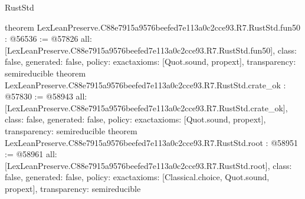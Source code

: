 \begin{lexlean}{RustStd}
\begin{coremodule}
{}
theorem LexLeanPreserve.C88e7915a9576beefed7e113a0c2cce93.R7.RustStd.fun50 : @56536 := @57826 {
  all: [LexLeanPreserve.C88e7915a9576beefed7e113a0c2cce93.R7.RustStd.fun50],
  class: false,
  generated: false,
  policy: exact{axioms: [Quot.sound, propext]},
  transparency: semireducible
}
theorem LexLeanPreserve.C88e7915a9576beefed7e113a0c2cce93.R7.RustStd.crate_ok : @57830 := @58943 {
  all: [LexLeanPreserve.C88e7915a9576beefed7e113a0c2cce93.R7.RustStd.crate_ok],
  class: false,
  generated: false,
  policy: exact{axioms: [Quot.sound, propext]},
  transparency: semireducible
}
theorem LexLeanPreserve.C88e7915a9576beefed7e113a0c2cce93.R7.RustStd.root : @58951 := @58961 {
  all: [LexLeanPreserve.C88e7915a9576beefed7e113a0c2cce93.R7.RustStd.root],
  class: false,
  generated: false,
  policy: exact{axioms: [Classical.choice, Quot.sound, propext]},
  transparency: semireducible
}


\end{coremodule}
\end{lexlean}
